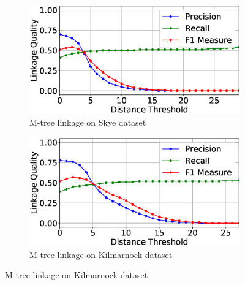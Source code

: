 \documentclass{llncs}
\begin{document}
\begin{figure}[t]
\centering
\begin{subfigure}{.5\textwidth}
  \centering
\includegraphics[width=\textwidth]{figures/plotLQ-skye-mtree}
\vspace{-6mm}
\caption{M-tree linkage on Skye dataset\label{skye-quality-mtree}}
\end{subfigure}%
\begin{subfigure}{.5\textwidth}
  \centering
\includegraphics[width=\textwidth]{figures/plotLQ-kilmarnock-mtree}
\vspace{-6mm}
\caption{M-tree linkage on Kilmarnock dataset\label{kilmarnock-quality-mtree}}
\end{subfigure} \vspace{5mm}


\end{figure}
\end{document}
